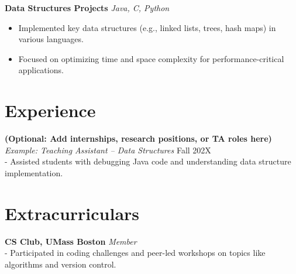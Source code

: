 \documentclass[a4paper,10pt]{article}
\begin{document}
\textbf{Data Structures Projects} \hfill \textit{Java, C, Python} \\
\begin{itemize}[leftmargin=0.15in]
  \item Implemented key data structures (e.g., linked lists, trees, hash maps) in various languages.
  \item Focused on optimizing time and space complexity for performance-critical applications.
\end{itemize}

\section*{Experience}
\textbf{(Optional: Add internships, research positions, or TA roles here)} \\
\textit{Example: Teaching Assistant – Data Structures} \hfill Fall 202X \\
- Assisted students with debugging Java code and understanding data structure implementation.

\section*{Extracurriculars}
\textbf{CS Club, UMass Boston} \hfill \textit{Member} \\
- Participated in coding challenges and peer-led workshops on topics like algorithms and version control.
\end{document}
